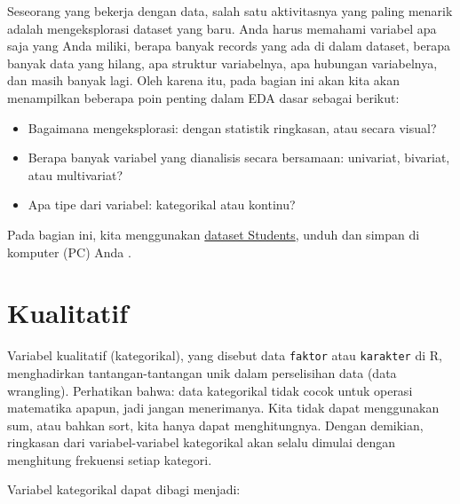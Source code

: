\documentclass[
]{book}
\providecommand{\tightlist}{%
  \setlength{\itemsep}{0pt}\setlength{\parskip}{0pt}}
\begin{document}
Seseorang yang bekerja dengan data, salah satu aktivitasnya yang paling menarik adalah mengeksplorasi dataset yang baru. Anda harus memahami variabel apa saja yang Anda miliki, berapa banyak records yang ada di dalam dataset, berapa banyak data yang hilang, apa struktur variabelnya, apa hubungan variabelnya, dan masih banyak lagi. Oleh karena itu, pada bagian ini akan kita akan menampilkan beberapa poin penting dalam EDA dasar sebagai berikut:

\begin{itemize}
\tightlist
\item
  Bagaimana mengeksplorasi: dengan statistik ringkasan, atau secara visual?
\item
  Berapa banyak variabel yang dianalisis secara bersamaan: univariat, bivariat, atau multivariat?
\item
  Apa tipe dari variabel: kategorikal atau kontinu?
\end{itemize}

Pada bagian ini, kita menggunakan \href{https://raw.githubusercontent.com/dsciencelabs/Algoritma_Pemrograman_R/main/Data/students.csv}{dataset Students}, unduh dan simpan di komputer (PC) Anda .

\hypertarget{kualitatif}{%
\section{Kualitatif}\label{kualitatif}}

Variabel kualitatif (kategorikal), yang disebut data \texttt{faktor} atau \texttt{karakter} di R, menghadirkan tantangan-tantangan unik dalam perselisihan data (data wrangling). Perhatikan bahwa: data kategorikal tidak cocok untuk operasi matematika apapun, jadi jangan menerimanya. Kita tidak dapat menggunakan sum, atau bahkan sort, kita hanya dapat menghitungnya. Dengan demikian, ringkasan dari variabel-variabel kategorikal akan selalu dimulai dengan menghitung frekuensi setiap kategori.

Variabel kategorikal dapat dibagi menjadi:
\end{document}
